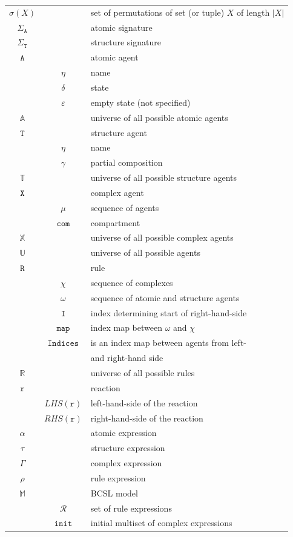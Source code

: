 \documentclass[12pt]{fithesis2}
\begin{document}
\begin{tabular}{c c | l}
$\sigma(X)$ & & set of permutations of set (or tuple) $X$ of length $|X|$\\
$\Sigma_{\mathtt{A}}$ & & atomic signature \\
$\Sigma_{\mathtt{T}}$ & & structure signature \\
$\mathtt{A}$ & & atomic agent \\
 & $\eta$ & name \\
 & $\delta$ & state \\
 & $\varepsilon$ & empty state (not specified)\\
$\mathds{A}$ & & universe of all possible atomic agents \\
$\mathtt{T}$ & & structure agent \\
 & $\eta$ & name \\
 & $\gamma$ & partial composition\\
$\mathds{T}$ & & universe of all possible structure agents\\
$\mathtt{X}$ & & complex agent\\
 & $\mu$ & sequence of agents\\
 & $\mathtt{com}$ & compartment\\
$\mathds{X}$ & & universe of all possible complex agents\\
$\mathds{U}$ & & universe of all possible agents\\
$\mathtt{R}$ & & rule\\
 & $\chi$ & sequence of complexes\\
 & $\omega$ & sequence of atomic and structure agents\\
 & $\mathtt{I}$ & index determining start of right-hand-side\\
 & $\mathtt{map}$ & index map between $\omega$ and $\chi$\\
 & $\mathtt{Indices}$ & is an index map between agents from left-\\
 & & and right-hand side\\
$\mathds{R}$ & & universe of all possible rules\\
$\mathtt{r}$ & & reaction\\
 & $LHS(\mathtt{r})$ & left-hand-side of the reaction\\
 & $RHS(\mathtt{r})$ & right-hand-side of the reaction\\
$\alpha$ & & atomic expression\\
$\tau$ & & structure expression\\
$\Gamma$ & & complex expression\\
$\rho$ & & rule expression\\
$\mathds{M}$ & & BCSL model\\
 & $\mathcal{R}$ & set of rule expressions\\
 & $\mathtt{init}$ & initial multiset of complex expressions\\
\end{tabular}
\end{document}
